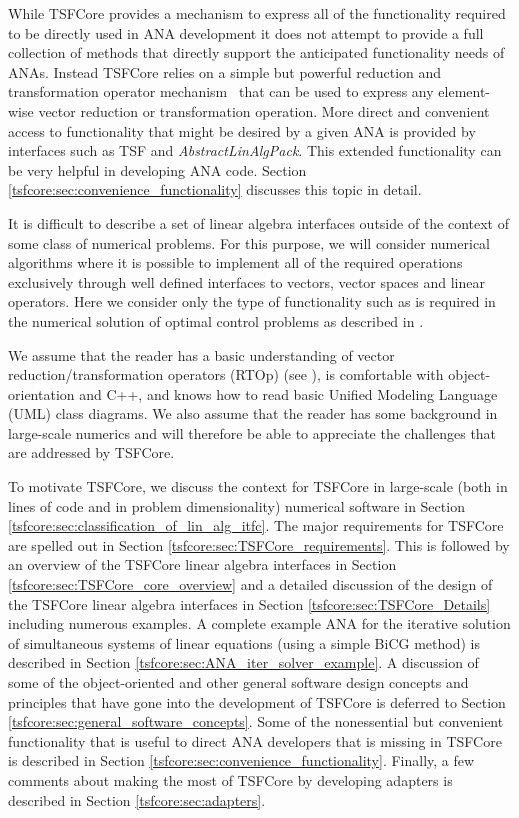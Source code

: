 While TSFCore provides a mechanism to express all of the functionality
required to be directly used in ANA development it does not attempt to
provide a full collection of methods that directly support the
anticipated functionality needs of ANAs.  Instead TSFCore relies on a
simple but powerful reduction and transformation operator
mechanism~\cite{ref:rtop_toms} that can be used to express any
element-wise vector reduction or transformation operation.  More
direct and convenient access to functionality that might be desired by
a given ANA is provided by interfaces such as TSF and
\textit{AbstractLinAlgPack}.  This extended functionality can be very
helpful in developing ANA code.  Section
\ref{tsfcore:sec:convenience_functionality} discusses this topic in
detail.

It is difficult to describe a set of linear algebra interfaces outside
of the context of some class of numerical problems.  For this purpose,
we will consider numerical algorithms where it is possible to
implement all of the required operations exclusively through well
defined interfaces to vectors, vector spaces and linear operators.
Here we consider only the type of functionality such as is required in
the numerical solution of optimal control problems as described in
\cite{ref:opt_ctrl_itfc}.

We assume that the reader has a basic understanding of vector
reduction/transformation operators (RTOp) (see \cite{ref:rtop_toms}),
is comfortable with object-orientation \cite{ref:gama_et_al_1995} and
C++, and knows how to read basic Unified Modeling Language (UML)
\cite{ref:uml_distilled_2nd_ed} class diagrams.  We also assume
that the reader has some background in large-scale numerics and will
therefore be able to appreciate the challenges that are addressed by
TSFCore.

To motivate TSFCore, we discuss the context for TSFCore in large-scale
(both in lines of code and in problem dimensionality) numerical
software in Section \ref{tsfcore:sec:classification_of_lin_alg_itfc}.
The major requirements for TSFCore are spelled out in Section
\ref{tsfcore:sec:TSFCore_requirements}.  This is followed by an
overview of the TSFCore linear algebra interfaces in Section
\ref{tsfcore:sec:TSFCore_core_overview} and a detailed discussion
of the design of the TSFCore linear algebra interfaces in Section
\ref{tsfcore:sec:TSFCore_Details} including numerous examples.  A
complete example ANA for the iterative solution of simultaneous
systems of linear equations (using a simple BiCG method) is described
in Section \ref{tsfcore:sec:ANA_iter_solver_example}.  A discussion of
some of the object-oriented and other general software design concepts
and principles that have gone into the development of TSFCore is
deferred to Section \ref{tsfcore:sec:general_software_concepts}.  Some
of the nonessential but convenient functionality that is useful to
direct ANA developers that is missing in TSFCore is described in
Section \ref{tsfcore:sec:convenience_functionality}. Finally, a few
comments about making the most of TSFCore by developing adapters is
described in Section \ref{tsfcore:sec:adapters}.

